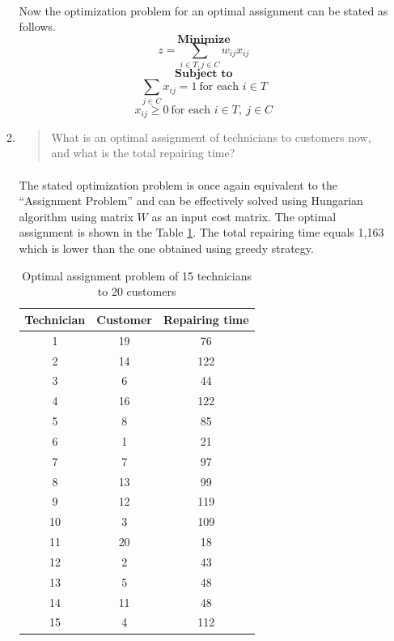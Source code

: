 \begin{enumerate}[(a)]
\begin{enumerate}[1.]
	\paragraph{}
	Now the optimization problem for an optimal assignment can be stated as follows.
$$
	\textbf{Minimize}
$$
$$
	z = \sum\limits_{i\in T, j\in C} w_{ij}x_{ij}
$$
$$
	\textbf{Subject to}
$$
$$
	\sum\limits_{j\in C} x_{ij} = 1 \ \text{for each }i\in T
$$
$$
	x_{ij} \geq 0 \ \text{for each }i\in T,\  j\in C
$$

\item\begin{quote}What is an optimal assignment of technicians to customers now, and what is
the total repairing time?\end{quote}

	\paragraph{}
	The stated optimization problem is once again equivalent to the ``Assignment Problem'' and can be effectively solved using Hungarian algorithm using matrix $W$ as an input cost matrix. The optimal assignment is shown in the Table \ref{hungarian-1-b}. The total repairing time equals 1,163 which is lower than the one obtained using greedy strategy.

\begin{table}[H]
	\centering
	\caption{Optimal assignment problem of 15 technicians to 20 customers}
	\begin{tabular}{|c|c|c|}\hline
Technician & Customer & Repairing time \\ \hline
1 & 19 & 76 \\
2 & 14 & 122 \\
3 & 6 & 44 \\
4 & 16 & 122 \\
5 & 8 & 85 \\
6 & 1 & 21 \\
7 & 7 & 97 \\
8 & 13 & 99 \\
9 & 12 & 119 \\
10 & 3 & 109 \\
11 & 20 & 18 \\
12 & 2 & 43 \\
13 & 5 & 48 \\
14 & 11 & 48 \\
15 & 4 & 112 \\
\hline
	\end{tabular}
	\label{hungarian-1-b}
\end{table}


\end{enumerate}
\end{enumerate}
